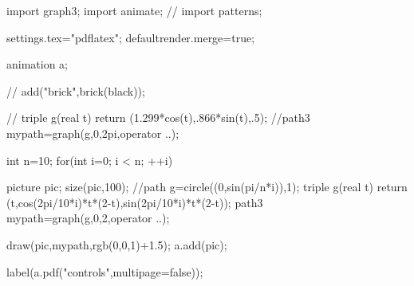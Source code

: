 import graph3;
import animate;
// import patterns;

settings.tex="pdflatex";
defaultrender.merge=true;


animation a;

// add("brick",brick(black));

// triple g(real t) {return (1.299*cos(t),.866*sin(t),.5);}
//path3 mypath=graph(g,0,2pi,operator ..);

int n=10;
for(int i=0; i < n; ++i) {
  picture pic;
  size(pic,100);
  //path g=circle((0,sin(pi/n*i)),1);
	triple g(real t) {return (t,cos(2pi/10*i)*t*(2-t),sin(2pi/10*i)*t*(2-t));}
  path3 mypath=graph(g,0,2,operator ..);
	
	draw(pic,mypath,rgb(0,0,1)+1.5);
  a.add(pic);
}

label(a.pdf("controls",multipage=false));


